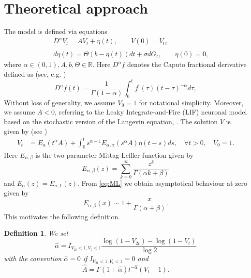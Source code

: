 \documentclass[11pt,reqno,oneside, a4paper]{amsart}
\numberwithin{equation}{section}
\newtheorem{definition}[thm]{Definition}
\theoremstyle{remark}
\begin{document}
\section{Theoretical approach}
\label{sec:theory}
The model is defined via equations 
\begin{eqnarray}\label{Gmod}
 && D^\alpha V_t = AV_t + \eta(t), \qquad V(0)=V_0,
\nonumber\\
&&
\\
&& d\eta(t) = \Theta(b-\eta(t))dt + \sigma dG_t, \qquad \eta(0)=0,\nonumber
 \end{eqnarray}
 where $\alpha \in (0,1), A,b,\Theta \in \mathbb R.$ Here $D^\alpha f$ denotes the Caputo fractional derivative defined as (see, e.g. \cite{MeerschaertStraka2013})
 \begin{equation}\label{eq:Caputo}
	D^{\alpha}f(t)=\frac{1}{\Gamma(1-\alpha)}\int_0^t f^\prime (\tau) (t-\tau)^{-\alpha} d\tau,
\end{equation}
  Without loss of generality, we assume $V_0=1$ for notational simplicity. Moreover, we assume $A<0$, referring to the Leaky Integrate-and-Fire (LIF) neuronal model  based on the stochastic version of the Langevin equation, \cite{Burk}. The solution $V$ is given by  (see \cite{Pirozzi2024})
\begin{align}
    V_t &= E_\alpha(t^\alpha A) + \int_0^t s^{\alpha-1}E_{\alpha,\alpha}(s^\alpha A)\eta(t-s)ds, \quad \forall t>0, \quad V_0=1. \label{eq:sol}
\end{align}
Here $E_{\alpha,\beta}$ is the two-parameter Mittag-Leffler function given by 
\begin{equation}
\label{eq:ML}
E_{\alpha,\beta}(z) = \sum_{k=0}^\infty \frac{z^k}{\Gamma(\alpha k + \beta)}
\end{equation}
and $E_\alpha(z) = E_{\alpha,1}(z)$. 
From \eqref{eq:ML} we obtain asymptotical behaviour at zero given by
$$
E_{\alpha,\beta}(x) \sim 1 + \frac{x}{\Gamma(\alpha + \beta)}.
$$
This motivates the following definition.
\begin{definition}
    We set 
    \begin{equation}
\label{eq:hatalpha}
    \hat\alpha = I_{V_{2t}<1, V_t<1}\frac{\log(1-V_{2t}) - \log(1-V_t)}{\log 2}
\end{equation}
with the convention $\hat\alpha = 0$ if $I_{V_{2t}<1, V_t<1}=0$
and
\begin{equation}
\label{eq:hatA}
    \hat{A} = \Gamma(1+\hat\alpha)t^{-\hat\alpha}(V_t-1).
\end{equation}
\end{definition}
\end{document}
